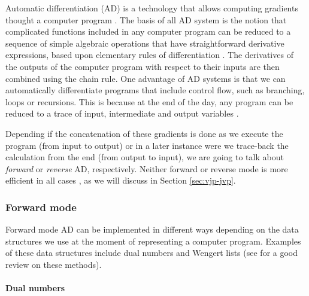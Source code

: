 Automatic differentiation (AD) is a technology that allows computing gradients thought a computer program \cite{griewank2008evaluatingderivatives}. 
The basis of all AD system is the notion that complicated functions included in any computer program can be reduced to a sequence of simple algebraic operations that have straightforward derivative expressions, based upon elementary rules of differentiation \cite{juedes1991taxonomy}.
The derivatives of the outputs of the computer program with respect to their inputs are then combined using the chain rule.
One advantage of AD systems is that we can automatically differentiate programs that include control flow, such as branching, loops or recursions. 
This is because at the end of the day, any program can be reduced to a trace of input, intermediate and output variables \cite{Baydin_Pearlmutter_Radul_Siskind_2015}.

Depending if the concatenation of these gradients is done as we execute the program (from input to output) or in a later instance were we trace-back the calculation from the end (from output to input), we are going to talk about \textit{forward} or \textit{reverse} AD, respectively.
Neither forward or reverse mode is more efficient in all cases \cite{Griewank_1989}, as we will discuss in Section \ref{sec:vjp-jvp}.

\subsubsection{Forward mode}

Forward mode AD can be implemented in different ways depending on the data structures we use at the moment of representing a computer program. Examples of these data structures include dual numbers and Wengert lists (see \cite{Baydin_Pearlmutter_Radul_Siskind_2015} for a good review on these methods). 

\paragraph{Dual numbers}

